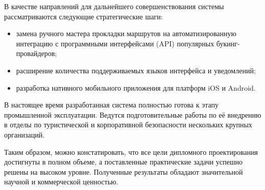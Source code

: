 В качестве направлений для дальнейшего совершенствования системы рассматриваются следующие стратегические шаги:
\begin{itemize}
    \item замена ручного мастера прокладки маршрутов на автоматизированную интеграцию с программными интерфейсами (API) популярных букинг-провайдеров;
    \item расширение количества поддерживаемых языков интерфейса и уведомлений;
    \item разработка нативного мобильного приложения для платформ iOS и Android.
\end{itemize}

В настоящее время разработанная система полностью готова к этапу промышленной эксплуатации. Ведутся подготовительные работы по её внедрению в отделы по туристической и корпоративной безопасности нескольких крупных организаций.

Таким образом, можно констатировать, что все цели дипломного проектирования достигнуты в полном объеме, а поставленные практические задачи успешно решены на высоком уровне. Полученные результаты обладают значительной научной и коммерческой ценностью.
